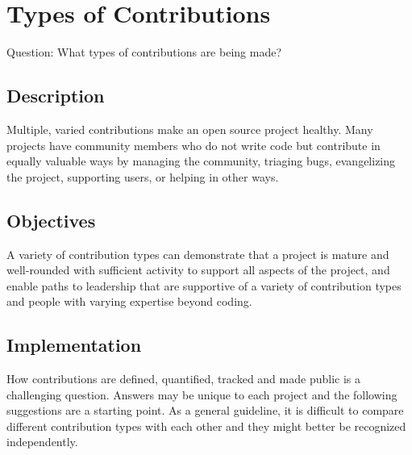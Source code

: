 \documentclass[
  12pt,
]{article}
\begin{document}
\hypertarget{types-of-contributions}{%
\section{Types of Contributions}\label{types-of-contributions}}

Question: What types of contributions are being made?

\hypertarget{description-1}{%
\subsection{Description}\label{description-1}}

Multiple, varied contributions make an open source project healthy. Many
projects have community members who do not write code but contribute in
equally valuable ways by managing the community, triaging bugs,
evangelizing the project, supporting users, or helping in other ways.

\hypertarget{objectives-1}{%
\subsection{Objectives}\label{objectives-1}}

A variety of contribution types can demonstrate that a project is mature
and well-rounded with sufficient activity to support all aspects of the
project, and enable paths to leadership that are supportive of a variety
of contribution types and people with varying expertise beyond coding.

\hypertarget{implementation-1}{%
\subsection{Implementation}\label{implementation-1}}

How contributions are defined, quantified, tracked and made public is a
challenging question. Answers may be unique to each project and the
following suggestions are a starting point. As a general guideline, it
is difficult to compare different contribution types with each other and
they might better be recognized independently.
\end{document}
